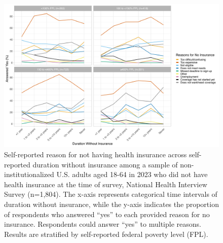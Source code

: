\documentclass[12pt]{article}
\begin{document}
\begin{figure}[H]
  \centering
  \includegraphics[width=15cm]{figures/duration_no_insurance_by_reason_by_fpl.png}
  \caption{Self-reported reason for not having health insurance across self-reported duration without insurance among a sample of non-institutionalized U.S. adults aged 18-64 in 2023 who did not have health insurance at the time of survey, National Health Interview Survey (n=1,804). The x-axis represents categorical time intervals of duration without insurance, while the y-axis indicates the proportion of respondents who answered “yes” to each provided reason for no insurance. Respondents could answer “yes” to multiple reasons. Results are stratified by self-reported federal poverty level (FPL).}
\end{figure}
\end{document}
